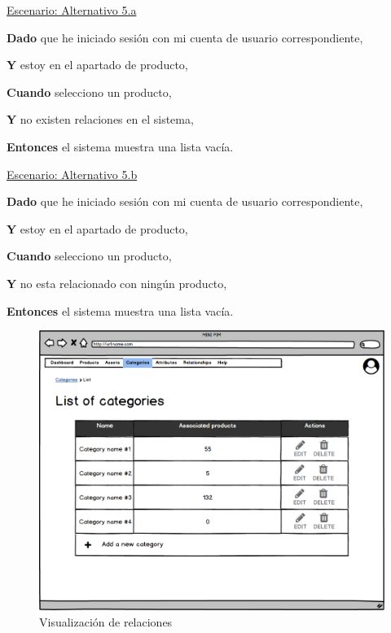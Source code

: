 \vspace{0.20cm}
\underline{Escenario: Alternativo 5.a}\par
\vspace{0.15cm}

\textbf{Dado} que he iniciado sesión con mi cuenta de usuario correspondiente,\par
\textbf{Y} estoy en el apartado de producto,\par
\textbf{Cuando} selecciono un producto,\par
\textbf{Y} no existen relaciones en el sistema,\par
\textbf{Entonces} el sistema muestra una lista vacía.\par

\vspace{0.20cm}
\underline{Escenario: Alternativo 5.b}\par
\vspace{0.15cm}

\textbf{Dado} que he iniciado sesión con mi cuenta de usuario correspondiente,\par
\textbf{Y} estoy en el apartado de producto,\par
\textbf{Cuando} selecciono un producto,\par
\textbf{Y} no esta relacionado con ningún producto,\par
\textbf{Entonces} el sistema muestra una lista vacía.\par

\vspace{0.20cm}

\begin{figure}[H]
    \includegraphics[width=1\linewidth]{mockups/RF4.2_1.png}
    \caption{Visualización de relaciones}
   \end{figure}
\vspace{1.0cm}

